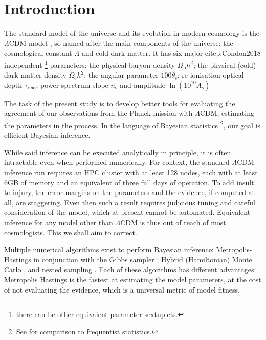 \documentclass[draft,usenatbib]{mnras}
\author{Aleksandr Petrosyan}
\date{\today}
\title{}
\begin{document}
\tableofcontents


\section{Introduction}
\label{sec:org0a68d24}

The standard model of the universe and its evolution in modern
cosmology is the \(\Lambda\)CDM model \citep{Condon2018}, so named
after the main components of the universe: the cosmological constant
\(\Lambda\) and cold dark matter. It has six major citep:Condon2018
independent \footnote{there can be other equivalent parameter
sextuplets.} parameters: the physical baryon density
\(\Omega_\mathrm{b}h^{2}\); the physical (cold) dark matter density
\(\Omega_\mathrm{c}h^{2}\); the angular parameter
\(100\theta_\mathrm{s}\); re-ionisation optical depth
\(\tau_\text{reio}\); power spectrum slope \(n_\mathrm{s}\) and
amplitude \(\ln (10^{10}A_\mathrm{s})\) \cite{Cosmology}

The task of the present study is to develop better tools for 
evaluating the agreement of our observations from the Planck mission
with \(\Lambda\)CDM, estimating the parameters in the process. In
the language of Bayesian statistics \footnote{See \cite{xkcd} for
comparison to frequentist statistics.}, our goal is efficient
Bayesian inference.

While said inference can be executed analytically in principle, it
is often intractable even when performed numerically. For context,
the standard \(\Lambda\)CDM inference run requires an HPC cluster
with at least 128 nodes, each with at least 6GB of memory and an
equivalent of three full days of operation. To add insult to injury,
the error margins on the parameters and the evidence, if computed at
all, are staggering.  Even then such a result requires judicious
tuning and careful consideration of the model, which at present
cannot be automated. Equivalent inference for any model other than
\(\Lambda\)CDM is thus out of reach of most cosmologists. This we
shall aim to correct.


Multiple numerical algorithms exist to perform Bayesian inference:
Metropolis-Hastings \citep{Metropolis} in conjunction with the Gibbs
sampler \citep{Metropolis-Hastings-Gibbs}; Hybrid (Hamiltonian)
Monte Carlo \citep{1701.02434,Duane_1987}, and nested sampling
\citep{Skilling2006}. Each of these algorithms has different
advantages: Metropolis Hastings is the fastest at estimating the
model parameters, at the cost of not evaluating the evidence, which
is a universal metric of model fitness. 
\end{document}

